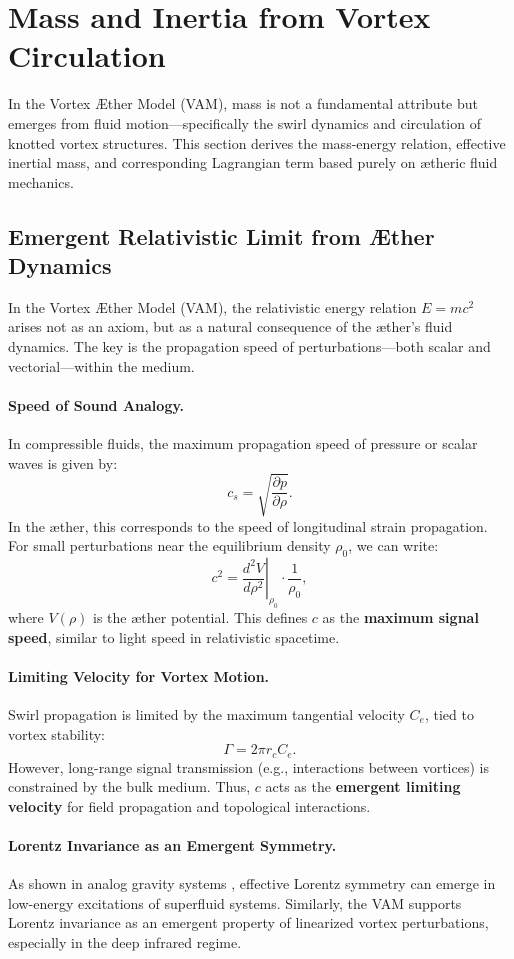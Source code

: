 \section{Mass and Inertia from Vortex Circulation}

In the Vortex Æther Model (VAM), mass is not a fundamental attribute but emerges from fluid motion—specifically the swirl dynamics and circulation of knotted vortex structures. This section derives the mass-energy relation, effective inertial mass, and corresponding Lagrangian term based purely on ætheric fluid mechanics.

\subsection{Emergent Relativistic Limit from Æther Dynamics}

In the Vortex Æther Model (VAM), the relativistic energy relation \( E = mc^2 \) arises not as an axiom, but as a natural consequence of the æther’s fluid dynamics. The key is the propagation speed of perturbations—both scalar and vectorial—within the medium.

\paragraph{Speed of Sound Analogy.}
In compressible fluids, the maximum propagation speed of pressure or scalar waves is given by:
\[
    c_s = \sqrt{\frac{\partial p}{\partial \rho}}.
\]
In the æther, this corresponds to the speed of longitudinal strain propagation. For small perturbations near the equilibrium density \( \rho_0 \), we can write:
\[
    c^2 = \left.\frac{d^2 V}{d\rho^2} \right|_{\rho_0} \cdot \frac{1}{\rho_0},
\]
where \( V(\rho) \) is the æther potential. This defines \( c \) as the \textbf{maximum signal speed}, similar to light speed in relativistic spacetime.

\paragraph{Limiting Velocity for Vortex Motion.}
Swirl propagation is limited by the maximum tangential velocity \( C_e \), tied to vortex stability:
\[
    \Gamma = 2\pi r_c C_e.
\]
However, long-range signal transmission (e.g., interactions between vortices) is constrained by the bulk medium. Thus, \( c \) acts as the \textbf{emergent limiting velocity} for field propagation and topological interactions.

\paragraph{Lorentz Invariance as an Emergent Symmetry.}
As shown in analog gravity systems \cite{barcelo2011}, effective Lorentz symmetry can emerge in low-energy excitations of superfluid systems. Similarly, the VAM supports Lorentz invariance as an emergent property of linearized vortex perturbations, especially in the deep infrared regime.

